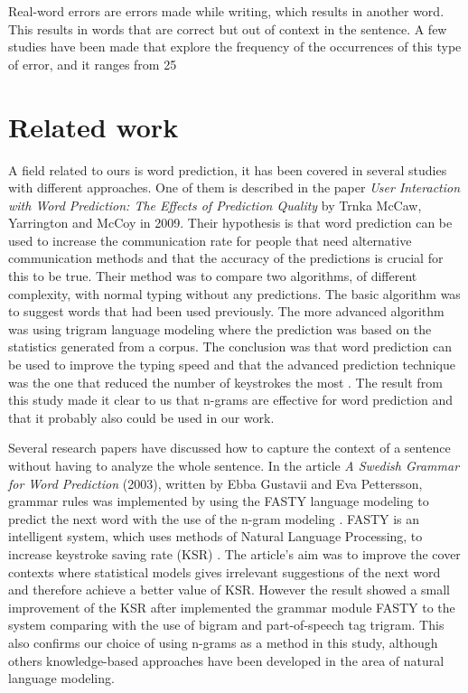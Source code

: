 \documentclass[a4paper,12pt]{article}
\begin{document}
Real-word errors are errors made while writing, which results in another word. This results in words that are correct but out of context in the sentence. A few studies have been made that explore the frequency of the occurrences of this type of error, and it ranges from 25 %

\section{Related work}
\label{sec:relatedwork}
A field related to ours is word prediction, it has been covered in several studies with different approaches. One of them is described in the paper \emph{User Interaction with Word Prediction: The Effects of Prediction Quality} by Trnka McCaw, Yarrington and McCoy in 2009. Their hypothesis is that word prediction can be used to increase the communication rate for people that need alternative communication methods and that the accuracy of the predictions is crucial for this to be true. Their method was to compare two algorithms, of different complexity, with normal typing without any predictions. The basic algorithm was to suggest words that had been used previously. The more advanced algorithm was using trigram language modeling where the prediction was based on the statistics generated from a corpus. The conclusion was that word prediction can be used to improve the typing speed and that the advanced prediction technique was the one that reduced the number of keystrokes the most \cite{trnka2009user}. The result from this study made it clear to us that n-grams are effective for word prediction and that it probably also could be used in our work.

Several research papers have discussed how to capture the context of a sentence without having to analyze the whole sentence. In the article \emph{A Swedish Grammar for Word Prediction} (2003), written by Ebba Gustavii and Eva Pettersson, grammar rules was implemented by using the FASTY language modeling to predict the next word with the use of the n-gram modeling \cite{gustavii2003a}. FASTY is an intelligent system, which uses methods of Natural Language Processing, to increase keystroke saving rate (KSR) \cite{fasty}.  The article's aim was to improve the cover contexts where statistical models gives irrelevant suggestions of the next word and therefore achieve a better value of KSR. However the result showed a small improvement of the KSR after implemented the grammar module FASTY to the system comparing with the use of bigram and part-of-speech tag trigram. This also confirms our choice of using n-grams as a method in this study, although others knowledge-based approaches have been developed in the area of natural language modeling. \cite{gustavii2003a}
\end{document}
